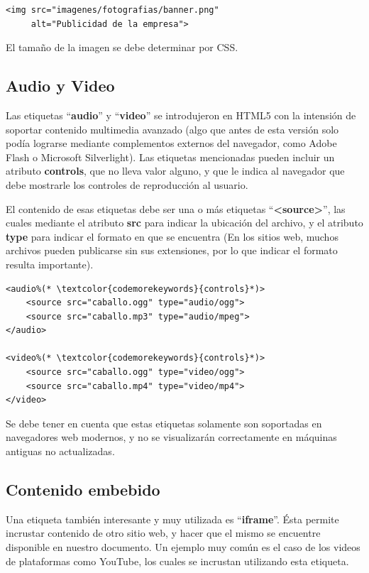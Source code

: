 \begin{lstlisting}[language=XHTML]
<img src="imagenes/fotografias/banner.png"
     alt="Publicidad de la empresa">
\end{lstlisting}

El tamaño de la imagen se debe determinar por CSS.

\subsection*{Audio y Video}

Las etiquetas ``\textbf{audio}'' y ``\textbf{video}'' se introdujeron en HTML5
con la intensión de soportar contenido multimedia avanzado (algo que antes de
esta versión solo podía lograrse mediante complementos externos del navegador,
como Adobe Flash o Microsoft Silverlight). Las etiquetas mencionadas pueden
incluir un atributo \textbf{controls}, que no lleva valor alguno, y que le indica al navegador
que debe mostrarle los controles de reproducción al usuario.

El contenido de esas etiquetas debe ser una o más etiquetas ``\textbf{<source>}'',
las cuales mediante el atributo \textbf{src} para indicar la ubicación del archivo,
y el atributo \textbf{type} para indicar el formato en que se encuentra (En los
sitios web, muchos archivos pueden publicarse sin sus extensiones, por lo que
indicar el formato resulta importante).

\begin{lstlisting}[language=XHTML]
<audio%(* \textcolor{codemorekeywords}{controls}*)>
    <source src="caballo.ogg" type="audio/ogg">
    <source src="caballo.mp3" type="audio/mpeg">
</audio>

<video%(* \textcolor{codemorekeywords}{controls}*)>
    <source src="caballo.ogg" type="video/ogg">
    <source src="caballo.mp4" type="video/mp4">
</video>
\end{lstlisting}

Se debe tener en cuenta que estas etiquetas solamente son soportadas en navegadores
web modernos, y no se visualizarán correctamente en máquinas antiguas no actualizadas.

\subsection*{Contenido embebido}

Una etiqueta también interesante y muy utilizada es ``\textbf{iframe}''.
Ésta permite incrustar contenido de otro sitio web, y hacer que el mismo se
encuentre disponible en nuestro documento. Un ejemplo muy común es el caso de los
videos de plataformas como YouTube, los cuales se incrustan utilizando esta etiqueta.

